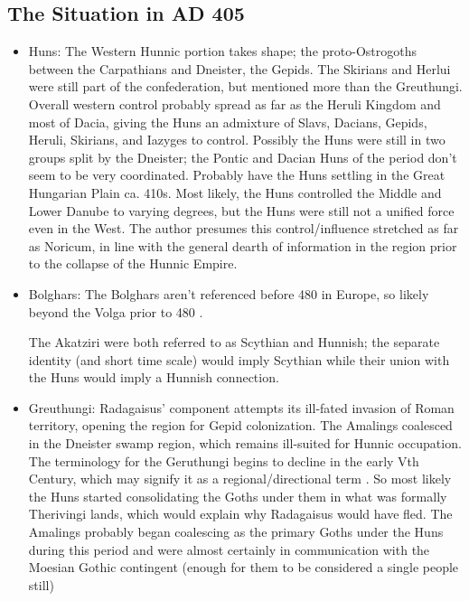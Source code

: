 \documentclass{article}
\begin{document}
	\newpage
	\subsection{The Situation in AD 405}
	\label{sec:timeline:subsec:405}
	
	\begin{itemize}
		\item Huns:\newline
		The Western Hunnic portion takes shape; the proto-Ostrogoths between the Carpathians and Dneister, the Gepids.
		The Skirians and Herlui were still part of the confederation, but mentioned more than the Greuthungi.
		Overall western control probably spread as far as the Heruli Kingdom and most of Dacia, giving the Huns an admixture of Slavs, Dacians, Gepids, Heruli, Skirians, and Iazyges to control.
		Possibly the Huns were still in two groups split by the Dneister; the Pontic and Dacian Huns of the period don't seem to be very coordinated.
		Probably have the Huns settling in the Great Hungarian Plain ca. 410s.
		Most likely, the Huns controlled the Middle and Lower Danube to varying degrees, but the Huns were still not a unified force even in the West.
		The author presumes this control/influence stretched as far as Noricum, in line with the general dearth of information in the region prior to the collapse of the Hunnic Empire.
		
		\item Bolghars:\newline
		The Bolghars aren't referenced before 480 in Europe, so likely beyond the Volga prior to 480 \cite{KimHuns}.
		
		The Akatziri were both referred to as Scythian and Hunnish; the separate identity (and short time scale) would imply Scythian while their union with the Huns would imply a Hunnish connection.
		
		\item Greuthungi:\newline
		Radagaisus' component attempts its ill-fated invasion of Roman territory, opening the region for Gepid colonization.
		The Amalings coalesced in the Dneister swamp region, which remains ill-suited for Hunnic occupation.
		The terminology for the Geruthungi begins to decline in the early Vth Century, which may signify it as a regional/directional term \cite{WolframHistoryOfTheGoths}.
		So most likely the Huns started consolidating the Goths under them in what was formally Therivingi lands, which would explain why Radagaisus would have fled.
		The Amalings probably began coalescing as the primary Goths under the Huns during this period and were almost certainly in communication with the Moesian Gothic contingent (enough for them to be considered a single people still)
		

\end{itemize}
\end{document}
